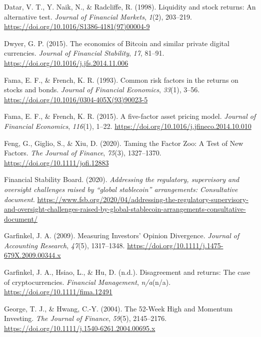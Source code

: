 \documentclass[
  12pt,
  a4paper,
  openany]{scrbook}
\newlength{\cslhangindent}
\newenvironment{CSLReferences}[2] %
 {\begin{list}{}{%
  \setlength{\itemindent}{0pt}
  \setlength{\leftmargin}{0pt}
  \setlength{\parsep}{0pt}
  \ifodd #1
   \setlength{\leftmargin}{\cslhangindent}
   \setlength{\itemindent}{-1\cslhangindent}
  \fi
  \setlength{\itemsep}{#2\baselineskip}}}
 {\end{list}}
\begin{document}
\begin{CSLReferences}{1}{0}
Datar, V. T., Y. Naik, N., \& Radcliffe, R. (1998). Liquidity and stock
returns: An alternative test. \emph{Journal of Financial Markets},
\emph{1}(2), 203--219.
\url{https://doi.org/10.1016/S1386-4181(97)00004-9}

Dwyer, G. P. (2015). The economics of Bitcoin and similar private
digital currencies. \emph{Journal of Financial Stability}, \emph{17},
81--91. \url{https://doi.org/10.1016/j.jfs.2014.11.006}

Fama, E. F., \& French, K. R. (1993). Common risk factors in the returns
on stocks and bonds. \emph{Journal of Financial Economics},
\emph{33}(1), 3--56. \url{https://doi.org/10.1016/0304-405X(93)90023-5}

Fama, E. F., \& French, K. R. (2015). A five-factor asset pricing model.
\emph{Journal of Financial Economics}, \emph{116}(1), 1--22.
\url{https://doi.org/10.1016/j.jfineco.2014.10.010}

Feng, G., Giglio, S., \& Xiu, D. (2020). Taming the Factor Zoo: A Test
of New Factors. \emph{The Journal of Finance}, \emph{75}(3), 1327--1370.
\url{https://doi.org/10.1111/jofi.12883}

Financial Stability Board. (2020). \emph{Addressing the regulatory,
supervisory and oversight challenges raised by {``global stablecoin''}
arrangements: Consultative document}.
\url{https://www.fsb.org/2020/04/addressing-the-regulatory-supervisory-and-oversight-challenges-raised-by-global-stablecoin-arrangements-consultative-document/}

Garfinkel, J. A. (2009). Measuring Investors' Opinion Divergence.
\emph{Journal of Accounting Research}, \emph{47}(5), 1317--1348.
\url{https://doi.org/10.1111/j.1475-679X.2009.00344.x}

Garfinkel, J. A., Hsiao, L., \& Hu, D. (n.d.). Disagreement and returns:
The case of cryptocurrencies. \emph{Financial Management},
\emph{n/a}(n/a). \url{https://doi.org/10.1111/fima.12491}

George, T. J., \& Hwang, C.-Y. (2004). The 52-Week High and Momentum
Investing. \emph{The Journal of Finance}, \emph{59}(5), 2145--2176.
\url{https://doi.org/10.1111/j.1540-6261.2004.00695.x}


\end{CSLReferences}
\end{document}
